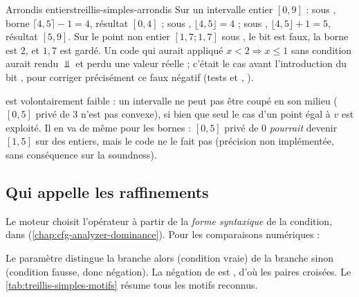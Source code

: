 \begin{exemple}{Arrondis entiers}{treillis-simples-arrondis}
  Sur un intervalle entier $[0,9]$ : sous , borne
  $\lceil 4{,}5 \rceil - 1 = 4$, résultat $[0,4]$ ; sous ,
  $\lfloor 4{,}5 \rfloor = 4$ ; sous , $\lfloor 4{,}5\rfloor +
  1 = 5$, résultat $[5,9]$. Sur le point non entier $[1{,}7; 1{,}7]$ sous
  , le bit est faux, la borne est $2$, et $1{,}7$ est gardé. Un
  code qui aurait appliqué $x < 2 \Rightarrow x \le 1$ sans condition aurait
  rendu $\Bot$ et perdu une valeur réelle ; c'était le cas avant
  l'introduction du bit , pour corriger précisément ce faux
  négatif (tests  et
  ,
  ).
\end{exemple}

 est volontairement faible : un intervalle ne peut pas être
coupé en son milieu ($[0,5]$ privé de $3$ n'est pas convexe), si bien que
seul le cas d'un point égal à $v$ est exploité. Il en va de même pour les
bornes : $[0,5]$ privé de $0$ \emph{pourrait} devenir $[1,5]$ sur des
entiers, mais le code ne le fait pas (précision non implémentée, sans
conséquence sur la soundness).

\subsection{Qui appelle les raffinements}

Le moteur choisit l'opérateur à partir de la \emph{forme syntaxique} de la
condition, dans 
(\cref{chap:cfg-analyzer-dominance}). Pour les comparaisons numériques :


Le paramètre  distingue la branche \og alors\fg{} (condition vraie)
de la branche \og sinon\fg{} (condition fausse, donc négation). La négation
de  est , d'où les paires croisées. Le
\cref{tab:treillis-simples-motifs} résume tous les motifs reconnus.

